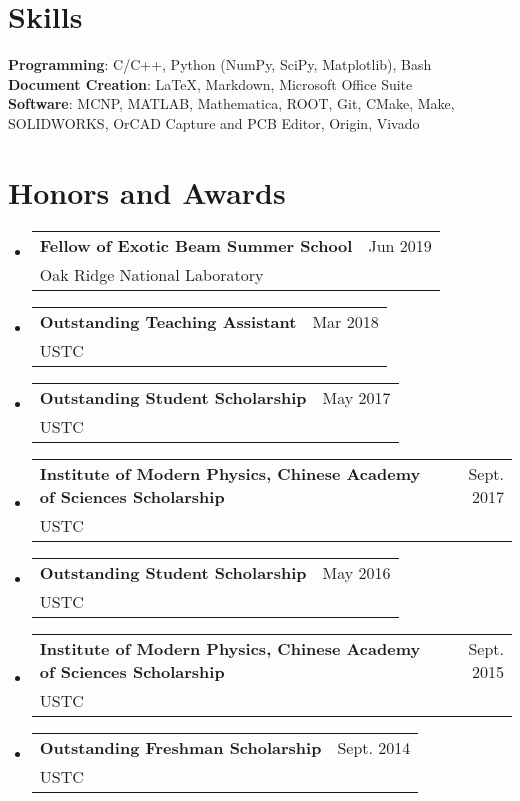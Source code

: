 \documentclass[letterpaper,11pt]{article} %
\makeatletter
\newcommand{\CVSubheading}[4]{
  \vspace{-2pt}\item
    \begin{tabular*}{0.97\textwidth}[t]{l@{\extracolsep{\fill}}r}
      \textbf{#1} & #2 \\
      \small#3 & \small #4 \\
    \end{tabular*}\vspace{-7pt}
}
\newcommand{\CVSubHeadingListStart}{\begin{itemize}[leftmargin=0.5cm, label={}]}
\newcommand{\CVSubHeadingListEnd}{\end{itemize}}
\makeatother
\begin{document}
\begin{comment}
This section is compressed from the various skills sections that Euro CV
recommends.
\end{comment}

\section{Skills}
 \begin{itemize}[leftmargin=0.5cm, label={}]
    {\item{
     \textbf{Programming}{: C/C++, Python (NumPy, SciPy, Matplotlib), Bash} \\
     \textbf{Document Creation}{: \LaTeX, Markdown, Microsoft Office Suite} \\
     \textbf{Software}{: MCNP, MATLAB, Mathematica, ROOT, Git, CMake, Make, SOLIDWORKS, OrCAD Capture and PCB Editor, Origin, Vivado}\\
    }}
 \end{itemize}


\section{Honors and Awards}
\CVSubHeadingListStart
    \CVSubheading
          {Fellow of Exotic Beam Summer School}{Jun 2019}
          {Oak Ridge National Laboratory}{}
    \CVSubheading
          {Outstanding Teaching Assistant}{Mar 2018}
          {USTC}{}
    \CVSubheading
          {Outstanding Student Scholarship}{May 2017}
          {USTC}{}
    \CVSubheading
          {Institute of Modern Physics, Chinese Academy of Sciences Scholarship}{Sept. 2017}
          {USTC}{}
    \CVSubheading
          {Outstanding Student Scholarship}{May 2016}
          {USTC}{}
    \CVSubheading
          {Institute of Modern Physics, Chinese Academy of Sciences Scholarship}{Sept. 2015}
          {USTC}{}
    \CVSubheading
          {Outstanding Freshman Scholarship}{Sept. 2014}
          {USTC}{}
\CVSubHeadingListEnd
\end{document}
